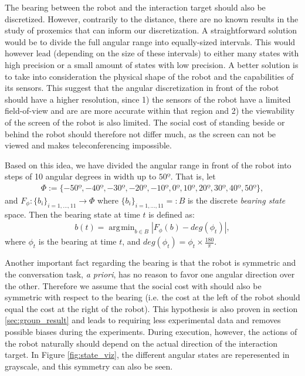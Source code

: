 \documentclass[a4paper,11pt]{report}
\DeclareMathOperator*{\argmin}{\arg\!\min}
\begin{document}
The bearing between the robot and the interaction target should also be discretized. However, contrarily to the distance, there are no known results in the study of proxemics that can inform our discretization. A straightforward solution would be to divide the full angular range into equally-sized intervals. This would however lead (depending on the size of these intervals) to either many states with high precision or a small amount of states with low precision. A better solution is to take into consideration the physical shape of the robot and the capabilities of its sensors. This suggest that the angular discretization in front of the robot should have a higher resolution, since 1) the sensors of the robot have a limited field-of-view and are are more accurate within that region and 2) the viewability of the screen of the robot is also limited. The social cost of standing beside or behind the robot should therefore not differ much, as the screen can not be viewed and makes teleconferencing impossible.

Based on this idea, we have divided the angular range in front of the robot into steps of 10 angular degrees in width up to $50º$. That is, let
\begin{align*}
  \Phi:=\{-50º,-40º,-30º,-20º,-10º,0º,10º,20º,30º,40º,50º\},
\end{align*}
and $F_\phi:\{b_i\}_{i=1,\ldots,11}\rightarrow \Phi$ where $\{b_i\}_{i=1,\ldots,11}=:B$ is the discrete \emph{bearing state} space. Then the bearing state at time $t$ is defined as:
\begin{align*}
  b(t) = \argmin_{b\in B}|F_\phi(b) - deg(\phi_t)|,
\end{align*}
where $\phi_t$ is the bearing at time $t$, and $deg(\phi_t)=\phi_t\times\frac{180}{\pi}$.

Another important fact regarding the bearing is that the robot is symmetric and the conversation task, \emph{a priori}, has no reason to favor one angular direction over the other. Therefore we assume that the social cost with should also be symmetric with respect to the bearing (i.e. the cost at the left of the robot should equal the cost at the right of the robot). This hypothesis is also proven in section \ref{sec:group_result} and leads to requiring less experimental data and removes possible biases during the experiments. During execution, however, the actions of the robot naturally should depend on the actual direction of the interaction target. In Figure \ref{fig:state_viz}, the different angular states are reperesented in grayscale, and this symmetry can also be seen.
\end{document}
